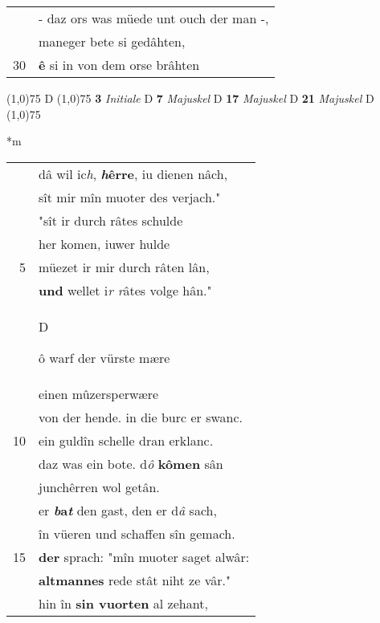 \documentclass[8pt,a4paper,notitlepage]{article}
\begin{document}
\begin{table}[ht]
\begin{minipage}[t]{0.5\linewidth}
\begin{tabular}{rl}
 & - daz ors was müede unt ouch der man -,\\ 
 & maneger bete si gedâhten,\\ 
30 & \textbf{ê} si in von dem orse brâhten\\ 
\end{tabular}
\scriptsize
\line(1,0){75} \newline
D \newline
\line(1,0){75} \newline
\textbf{3} \textit{Initiale} D  \textbf{7} \textit{Majuskel} D  \textbf{17} \textit{Majuskel} D  \textbf{21} \textit{Majuskel} D  \newline
\line(1,0){75} \newline
\newline
\end{minipage}
\hspace{0.5cm}
\begin{minipage}[t]{0.5\linewidth}
\small
\begin{center}*m
\end{center}
\begin{tabular}{rl}
 & dâ wil ic\textit{h}, \textbf{\textit{h}êrre}, iu dienen nâch,\\ 
 & sît mir mîn muoter des verjach."\\ 
 & "sît ir durch râtes schulde\\ 
 & her komen, iuwer hulde\\ 
5 & müezet ir mir durch râten lân,\\ 
 & \textbf{und} wellet i\textit{r r}âtes volge hân."\\ 
 & \begin{large}D\end{large}ô warf der vürste mære\\ 
 & einen mûzersperwære\\ 
 & von der hende. in die burc er swanc.\\ 
10 & ein guldîn schelle dran erklanc.\\ 
 & daz was ein bote. d\textit{ô} \textbf{kômen} sân\\ 
 & junchêrren wol getân.\\ 
 & er \textbf{\textit{b}a\textit{t}} den gast, den er d\textit{â} sach,\\ 
 & în vüeren und schaffen sîn gemach.\\ 
15 & \textbf{der} sprach: "mîn muoter saget alwâr:\\ 
 & \textbf{altmannes} rede stât niht ze vâr."\\ 
 & hin în \textbf{sin vuorten} al zehant,\\ 

\end{tabular}
\end{minipage}
\end{table}
\end{document}
